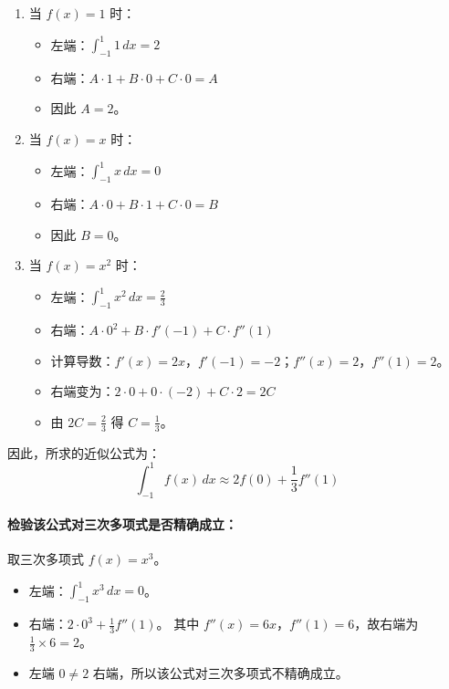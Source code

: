 \documentclass{article}
\begin{document}
\begin{enumerate}
    \item 当 \( f(x) = 1 \) 时：
    \begin{itemize}
        \item 左端：\( \int_{-1}^1 1\,dx = 2 \)
        \item 右端：\( A \cdot 1 + B \cdot 0 + C \cdot 0 = A \)
        \item 因此 \( A = 2 \)。
    \end{itemize}
    \item 当 \( f(x) = x \) 时：
    \begin{itemize}
        \item 左端：\( \int_{-1}^1 x\,dx = 0 \)
        \item 右端：\( A \cdot 0 + B \cdot 1 + C \cdot 0 = B \)
        \item 因此 \( B = 0 \)。
    \end{itemize}
    \item 当 \( f(x) = x^2 \) 时：
    \begin{itemize}
        \item 左端：\( \int_{-1}^1 x^2\,dx = \frac{2}{3} \)
        \item 右端：\( A \cdot 0^2 + B \cdot f'(-1) + C \cdot f''(1) \)
        \item 计算导数：\( f'(x) = 2x \)，\( f'(-1) = -2 \)；\( f''(x) = 2 \)，\( f''(1) = 2 \)。
        \item 右端变为：\( 2 \cdot 0 + 0 \cdot (-2) + C \cdot 2 = 2C \)
        \item 由 \( 2C = \frac{2}{3} \) 得 \( C = \frac{1}{3} \)。
    \end{itemize}
\end{enumerate}

因此，所求的近似公式为：
\[
\int_{-1}^1 f(x)\,dx \approx 2f(0) + \frac{1}{3}f''(1)
\]

\paragraph{检验该公式对三次多项式是否精确成立：}
取三次多项式 \( f(x) = x^3 \)。
\begin{itemize}
    \item 左端：\( \int_{-1}^1 x^3\,dx = 0 \)。
    \item 右端：\( 2 \cdot 0^3 + \frac{1}{3} f''(1) \)。
    其中 \( f''(x) = 6x \)，\( f''(1) = 6 \)，故右端为 \( \frac{1}{3} \times 6 = 2 \)。
    \item 左端 \( 0 \neq 2 \) 右端，所以该公式对三次多项式不精确成立。
\end{itemize}
\end{document}
